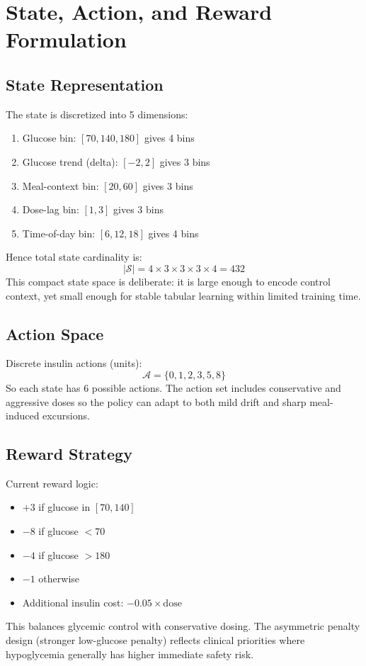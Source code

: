 \documentclass[conference]{IEEEtran}
\begin{document}
\section{State, Action, and Reward Formulation}
\subsection{State Representation}
The state is discretized into 5 dimensions:
\begin{enumerate}
    \item Glucose bin: \([70, 140, 180]\) gives 4 bins
    \item Glucose trend (delta): \([-2, 2]\) gives 3 bins
    \item Meal-context bin: \([20, 60]\) gives 3 bins
    \item Dose-lag bin: \([1, 3]\) gives 3 bins
    \item Time-of-day bin: \([6, 12, 18]\) gives 4 bins
\end{enumerate}
Hence total state cardinality is:
\begin{equation}
|\mathcal{S}| = 4 \times 3 \times 3 \times 3 \times 4 = 432
\end{equation}
This compact state space is deliberate: it is large enough to encode control context, yet small enough for stable tabular learning within limited training time.

\subsection{Action Space}
Discrete insulin actions (units):
\begin{equation}
\mathcal{A} = \{0, 1, 2, 3, 5, 8\}
\end{equation}
So each state has 6 possible actions.
The action set includes conservative and aggressive doses so the policy can adapt to both mild drift and sharp meal-induced excursions.

\subsection{Reward Strategy}
Current reward logic:
\begin{itemize}
    \item \(+3\) if glucose in \([70, 140]\)
    \item \(-8\) if glucose \(< 70\)
    \item \(-4\) if glucose \(> 180\)
    \item \(-1\) otherwise
    \item Additional insulin cost: \(-0.05 \times \text{dose}\)
\end{itemize}
This balances glycemic control with conservative dosing.
The asymmetric penalty design (stronger low-glucose penalty) reflects clinical priorities where hypoglycemia generally has higher immediate safety risk.
\end{document}
